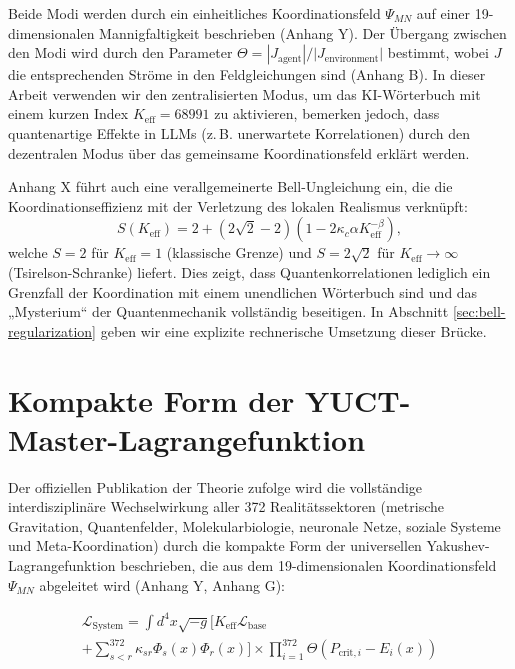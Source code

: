 \documentclass[12pt,a4paper]{article}
\begin{document}
	Beide Modi werden durch ein einheitliches Koordinationsfeld \(\Psi_{MN}\) auf einer 19-dimensionalen Mannigfaltigkeit beschrieben (Anhang Y). Der Übergang zwischen den Modi wird durch den Parameter \(\Theta = |J_{\text{agent}}|/|J_{\text{environment}}|\) bestimmt, wobei \(J\) die entsprechenden Ströme in den Feldgleichungen sind (Anhang B). In dieser Arbeit verwenden wir den zentralisierten Modus, um das KI-Wörterbuch mit einem kurzen Index \(K_{\mathrm{eff}} = 68991\) zu aktivieren, bemerken jedoch, dass quantenartige Effekte in LLMs (z. B. unerwartete Korrelationen) durch den dezentralen Modus über das gemeinsame Koordinationsfeld erklärt werden.
	
	Anhang X führt auch eine verallgemeinerte Bell-Ungleichung ein, die die Koordinationseffizienz mit der Verletzung des lokalen Realismus verknüpft:
	\[
	S(K_{\mathrm{eff}}) = 2 + (2\sqrt{2}-2)\left(1 - 2\kappa_c\alpha K_{\mathrm{eff}}^{-\beta}\right),
	\]
	welche \(S=2\) für \(K_{\mathrm{eff}}=1\) (klassische Grenze) und \(S=2\sqrt2\) für \(K_{\mathrm{eff}}\to\infty\) (Tsirelson-Schranke) liefert. Dies zeigt, dass Quantenkorrelationen lediglich ein Grenzfall der Koordination mit einem unendlichen Wörterbuch sind und das „Mysterium“ der Quantenmechanik vollständig beseitigen. In Abschnitt \ref{sec:bell-regularization} geben wir eine explizite rechnerische Umsetzung dieser Brücke.
	
	\section{Kompakte Form der YUCT-Master-Lagrangefunktion}
	Der offiziellen Publikation der Theorie zufolge wird die vollständige interdisziplinäre Wechselwirkung aller 372 Realitätssektoren (metrische Gravitation, Quantenfelder, Molekularbiologie, neuronale Netze, soziale Systeme und Meta-Koordination) durch die kompakte Form der universellen Yakushev-Lagrangefunktion beschrieben, die aus dem 19-dimensionalen Koordinationsfeld \(\Psi_{MN}\) abgeleitet wird (Anhang Y, Anhang G):
	
	\begin{multline}
		\mathscr{L}_{\text{System}} = \int d^4x \sqrt{-g} \Bigg[ K_{\text{eff}} \mathscr{L}_{\text{base}} \\
		+ \sum_{s<r}^{372} \kappa_{sr} \Phi_s(x) \Phi_r(x) \Bigg] \times \prod_{i=1}^{372} \Theta(P_{\text{crit},i} - E_i(x))
	\end{multline}
	
\end{document}
